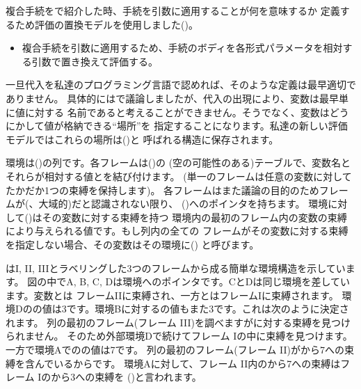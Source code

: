 複合手続をで紹介した時、手続を引数に適用することが何を意味するか
定義するため評価の置換モデルを使用しました()。

\begin{itemize}

\item
複合手続を引数に適用するため、手続のボディを各形式パラメータを相対する引数で置き換えて評価する。

\end{itemize}

\noindent
一旦代入を私達のプログラミング言語で認めれば、そのような定義は最早適切でありません。
具体的にはで議論しましたが、代入の出現により、変数は最早単に値に対する
名前であると考えることができません。そうでなく、変数はどうにかして値が格納できる``場所''を
指定することになります。私達の新しい評価モデルではこれらの場所は()と
呼ばれる構造に保存されます。



環境は()の列です。各フレームは()の
(空の可能性のある)テーブルで、変数名とそれらが相対する値とを結び付けます。
(単一のフレームは任意の変数に対してたかだか1つの束縛を保持します)。
各フレームはまた議論の目的のためフレームが(、大域的)だと認識されない限り、
()へのポインタを持ちます。
環境に対して()はその変数に対する束縛を持つ
環境内の最初のフレーム内の変数の束縛により与えられる値です。もし列内の全ての
フレームがその変数に対する束縛を指定しない場合、その変数はその環境に()
と呼びます。



はI, II, IIIとラベリングした3つのフレームから成る簡単な環境構造を示しています。
図の中でA, B, C, Dは環境へのポインタです。CとDは同じ環境を差しています。変数とは
フレームIIに束縛され、一方とはフレームIに束縛されます。
環境Dのの値は3です。環境Bに対するの値もまた3です。これは次のように決定されます。
列の最初のフレーム(フレーム III)を調べますがに対する束縛を見つけられません。
そのため外部環境Dで続けてフレーム Iの中に束縛を見つけます。一方で環境Aでのの値は7です。
列の最初のフレーム(フレーム II)がから7への束縛を含んでいるからです。
環境Aに対して、フレーム II内のから7への束縛はフレーム Iのから3への束縛を
()と言われます。


